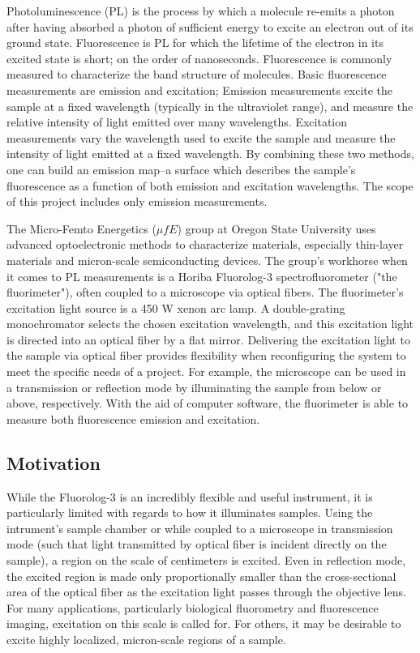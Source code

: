 Photoluminescence (PL) is the process by which a molecule re-emits a photon after having absorbed a photon of sufficient energy to excite an electron out of its ground state. Fluorescence is PL for which the lifetime of the electron in its excited state is short; on the order of nanoseconds. Fluorescence is commonly measured to characterize the band structure of molecules. Basic fluorescence measurements are emission and excitation; Emission measurements excite the sample at a fixed wavelength (typically in the ultraviolet range), and measure the relative intensity of light emitted over many wavelengths. Excitation measurements vary the wavelength used to excite the sample and measure the intensity of light emitted at a fixed wavelength. By combining these two methods, one can build an emission map--a surface which describes the sample's fluorescence as a function of both emission and excitation wavelengths. The scope of this project includes only emission measurements.

The Micro-Femto Energetics ($\mu fE$) group at Oregon State University uses advanced optoelectronic methods to characterize materials, especially thin-layer materials and micron-scale semiconducting devices. The group's workhorse when it comes to PL measurements is a Horiba Fluorolog-3 spectrofluorometer ("the fluorimeter"), often coupled to a microscope via optical fibers. The fluorimeter's excitation light source is a 450 W xenon arc lamp. A double-grating monochromator selects the chosen excitation wavelength, and this excitation light is directed into an optical fiber by a flat mirror. Delivering the excitation light to the sample via optical fiber provides flexibility when reconfiguring the system to meet the specific needs of a project. For example, the microscope can be used in a transmission or reflection mode by illuminating the sample from below or above, respectively. With the aid of computer software, the fluorimeter is able to measure both fluorescence emission and excitation.

\subsection{Motivation}
While the Fluorolog-3 is an incredibly flexible and useful instrument, it is particularly limited with regards to how it illuminates samples. Using the intrument's sample chamber or while coupled to a microscope in transmission mode (such that light transmitted by optical fiber is incident directly on the sample), a region on the scale of centimeters is excited. Even in reflection mode, the excited region is made only proportionally smaller than the cross-sectional area of the optical fiber as the excitation light passes through the objective lens. For many applications, particularly biological fluorometry and fluorescence imaging, excitation on this scale is called for. For others, it may be desirable to excite highly localized, micron-scale regions of a sample.

